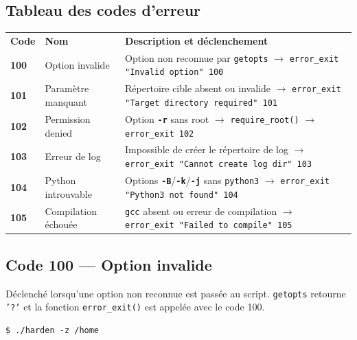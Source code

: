 \documentclass[12pt,a4paper]{article}
\newcommand{\opt}[1]{\texttt{\textcolor{bleuMed}{\textbf{#1}}}}
\newcommand{\cmd}[1]{\texttt{\textcolor{codeText}{#1}}}
\begin{document}
\subsection{Tableau des codes d'erreur}

\vspace{6pt}
\begin{tabular}{C{1.5cm} L{3.5cm} L{8.8cm}}
  \textbf{\color{white}Code} & \textbf{\color{white}Nom} & \textbf{\color{white}Description et déclenchement} \\
  \textcolor{rouge}{\textbf{100}} & Option invalide     & Option non reconnue par \cmd{getopts} $\rightarrow$ \cmd{error\_exit "Invalid option" 100} \\
  \textcolor{rouge}{\textbf{101}} & Paramètre manquant  & Répertoire cible absent ou invalide $\rightarrow$ \cmd{error\_exit "Target directory required" 101} \\
  \textcolor{rouge}{\textbf{102}} & Permission denied   & Option \opt{-r} sans root $\rightarrow$ \cmd{require\_root()} $\rightarrow$ \cmd{error\_exit 102} \\
  \textcolor{rouge}{\textbf{103}} & Erreur de log       & Impossible de créer le répertoire de log $\rightarrow$ \cmd{error\_exit "Cannot create log dir" 103} \\
  \textcolor{rouge}{\textbf{104}} & Python introuvable  & Options \opt{-B}/\opt{-k}/\opt{-j} sans \cmd{python3} $\rightarrow$ \cmd{error\_exit "Python3 not found" 104} \\
  \textcolor{rouge}{\textbf{105}} & Compilation échouée & \cmd{gcc} absent ou erreur de compilation $\rightarrow$ \cmd{error\_exit "Failed to compile" 105} \\
\end{tabular}

\subsection{Code 100 --- Option invalide}

Déclenché lorsqu'une option non reconnue est passée au script. \cmd{getopts} retourne \texttt{'?'} et la fonction \cmd{error\_exit()} est appelée avec le code 100.

\begin{lstlisting}[style=bash]
$ ./harden -z /home
\end{lstlisting}
\end{document}
